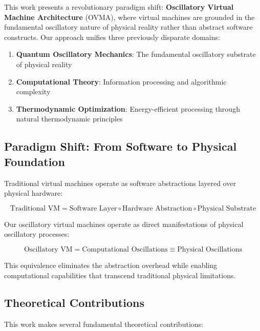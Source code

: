 \documentclass[12pt,a4paper]{article}
\begin{document}
This work presents a revolutionary paradigm shift: \textbf{Oscillatory Virtual Machine Architecture} (OVMA), where virtual machines are grounded in the fundamental oscillatory nature of physical reality rather than abstract software constructs. Our approach unifies three previously disparate domains:

\begin{enumerate}
\item \textbf{Quantum Oscillatory Mechanics}: The fundamental oscillatory substrate of physical reality
\item \textbf{Computational Theory}: Information processing and algorithmic complexity
\item \textbf{Thermodynamic Optimization}: Energy-efficient processing through natural thermodynamic principles
\end{enumerate}

\subsection{Paradigm Shift: From Software to Physical Foundation}

Traditional virtual machines operate as software abstractions layered over physical hardware:

\begin{equation}
\text{Traditional VM} = \text{Software Layer} \circ \text{Hardware Abstraction} \circ \text{Physical Substrate}
\end{equation}

Our oscillatory virtual machines operate as direct manifestations of physical oscillatory processes:

\begin{equation}
\text{Oscillatory VM} = \text{Computational Oscillations} \equiv \text{Physical Oscillations}
\end{equation}

This equivalence eliminates the abstraction overhead while enabling computational capabilities that transcend traditional physical limitations.

\subsection{Theoretical Contributions}

This work makes several fundamental theoretical contributions:
\end{document}

